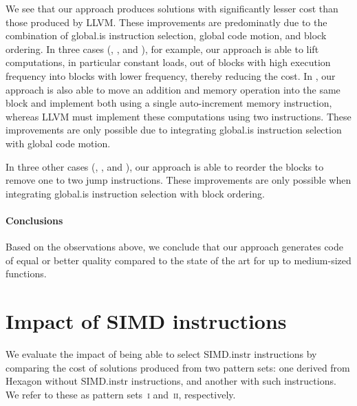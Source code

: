 We see that our approach produces \glspl{solution} with significantly lesser
cost than those produced by \gls{LLVM}.
%
These improvements are predominatly due to the combination of \gls{global.is}
\gls{instruction selection}, \gls{global code motion}, and \gls{block ordering}.
%
In three cases (, ,
and ), for example, our approach is able to lift
computations, in particular constant loads, out of \glspl{block} with high
execution frequency into \glspl{block} with lower frequency, thereby reducing
the cost.
%
In , our approach is also able to move an addition
and memory operation into the same \gls{block} and implement both using a single
auto-increment memory \gls{instruction}, whereas \gls{LLVM} must implement these
computations using two \glspl{instruction}.
%
These improvements are only possible due to integrating \gls{global.is}
\gls{instruction selection} with \gls{global code motion}.

In three other cases (,
, and ), our approach
is able to reorder the \glspl{block} to remove one to two jump
\glspl{instruction}.
%
These improvements are only possible when integrating \gls{global.is}
\gls{instruction selection} with \gls{block ordering}.


\paragraph{Conclusions}

Based on the observations above, we conclude that our approach generates code of
equal or better quality compared to the state of the art for up to medium-sized
\glspl{function}.



\section{Impact of SIMD instructions}

\def\patternSetA{\textsc{i}}
\def\patternSetB{\textsc{ii}}

We evaluate the impact of being able to select \gls{SIMD.instr}
\glspl{instruction} by comparing the cost of \glspl{solution} produced from two
\glspl{pattern set}: one derived from \gls{Hexagon} without \gls{SIMD.instr}
\glspl{instruction}, and another with such \glspl{instruction}.
%
We refer to these as \glspl{pattern set}~\patternSetA{} and~\patternSetB,
respectively.

